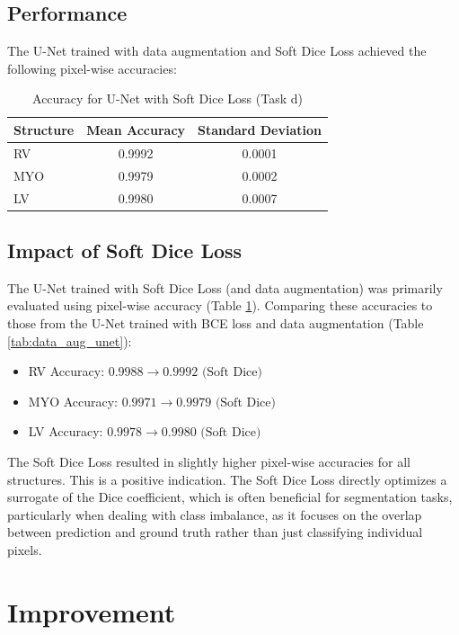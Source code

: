 \documentclass{article}
\begin{document}
\subsection{Performance}
The U-Net trained with data augmentation and Soft Dice Loss achieved the following pixel-wise accuracies:
\begin{table}[H]
  \centering
  \caption{Accuracy for U-Net with Soft Dice Loss (Task d)}
  \label{tab:soft_dice_unet}
  \begin{tabular}{lcc}
    \toprule
    Structure & Mean Accuracy & Standard Deviation \\
    \midrule
    RV        & 0.9992        & 0.0001             \\
    MYO       & 0.9979        & 0.0002             \\
    LV        & 0.9980        & 0.0007             \\
    \bottomrule
  \end{tabular}
\end{table}

\subsection{Impact of Soft Dice Loss}
The U-Net trained with Soft Dice Loss (and data augmentation) was primarily evaluated using pixel-wise accuracy
(Table \ref{tab:soft_dice_unet}). Comparing these accuracies to those from the U-Net trained with BCE loss and
data augmentation (Table \ref{tab:data_aug_unet}):
\begin{itemize}
  \item RV Accuracy: $0.9988 \rightarrow 0.9992 \text{ (Soft Dice)}$
  \item MYO Accuracy: $0.9971 \rightarrow 0.9979 \text{ (Soft Dice)}$
  \item LV Accuracy: $0.9978 \rightarrow 0.9980 \text{ (Soft Dice)}$
\end{itemize}
The Soft Dice Loss resulted in slightly higher pixel-wise accuracies for all structures. This is a positive indication.
The Soft Dice Loss directly optimizes a surrogate of the Dice coefficient, which is often beneficial for segmentation tasks,
particularly when dealing with class imbalance, as it focuses on the overlap between prediction and ground truth rather
than just classifying individual pixels.



\section{Improvement}
\end{document}
